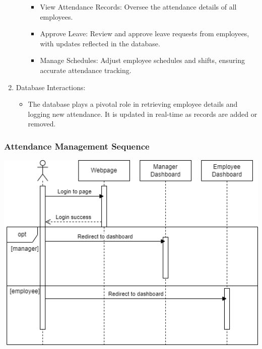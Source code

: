 \documentclass[a4paper, 12pt]{article}
\begin{document}
\begin{enumerate}
\begin{itemize}
        \begin{itemize}
            \item View Attendance Records: Oversee the attendance details of all employees.
            \item Approve Leave: Review and approve leave requests from employees, with updates reflected in the database.
            \item Manage Schedules: Adjust employee schedules and shifts, ensuring accurate attendance tracking.
        \end{itemize}
    \end{itemize}
    \item Database Interactions:
    \begin{itemize}
        \item The database plays a pivotal role in retrieving employee details and logging new attendance. It is updated in real-time as records are added or removed.
    \end{itemize}
\end{enumerate}
\subsubsection{Attendance Management Sequence}
\begin{center}
\includegraphics[width=1\textwidth]{Attendance Management Sequence.png}\par
\end{center}
\end{document}
